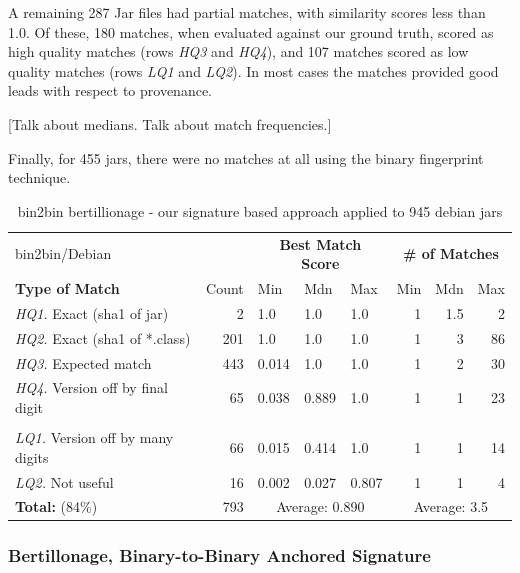 A remaining 287 Jar files had partial matches, with similarity scores less than 1.0.
Of these, 180 matches, when evaluated against our ground truth, scored as high quality matches (rows \emph{HQ3} and \emph{HQ4}),
and 107 matches scored as low quality matches (rows \emph{LQ1} and \emph{LQ2}).
In most cases the matches provided good leads with respect to provenance.

[Talk about medians.  Talk about match frequencies.]

Finally, for 455 jars, there were no matches at all using the binary fingerprint technique.



\begin{table}[h]
  \centering
\begin{tabular}[htbp]{l|r|lll|rrr}
  bin2bin/Debian             &                & \multicolumn{3}{c|}{\textbf{Best Match Score}}  & \multicolumn{3}{c}{\textbf{\# of Matches}} \\
  \textbf{Type of Match}     & Count        & Min   & Mdn    & Max   & Min  & Mdn  & Max  \\
  \hline
  \emph{HQ1.} Exact (sha1 of jar)        &   2          & 1.0   & 1.0    & 1.0   & 1    & 1.5  &  2   \\
  \emph{HQ2.} Exact (sha1 of *.class)    & 201          & 1.0   & 1.0    & 1.0   & 1    & 3    & 86   \\
  \emph{HQ3.} Expected match             & 443          & 0.014 & 1.0    & 1.0   & 1    & 2    & 30   \\
  \emph{HQ4.} Version off by final digit &  65          & 0.038 & 0.889  & 1.0   & 1    & 1    & 23   \\
  & & & & & & & \\
  \emph{LQ1.} Version off by many digits &  66          & 0.015 & 0.414  & 1.0   & 1    & 1    & 14   \\
  \emph{LQ2.} Not useful                 &  16          & 0.002 & 0.027  & 0.807 & 1    & 1    &  4   \\
  \hline
  \textbf{Total:} \hspace{8em}    (84\%) &  793   & \multicolumn{3}{c|}{Average: 0.890}  & \multicolumn{3}{c}{Average: 3.5} \\
\end{tabular}
  \caption{bin2bin bertillionage - our signature based approach applied to 945 debian jars}
  \label{tab:debianBin2Bin}
\end{table}


\subsubsection{Bertillonage, Binary-to-Binary Anchored Signature}


